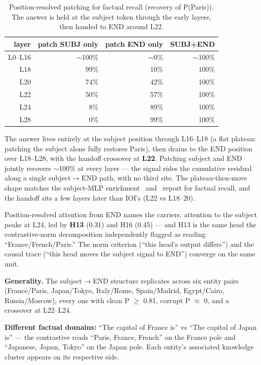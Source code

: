 \documentclass[11pt]{article}
\begin{document}
\begin{table}[htbp]
\centering
\small
\begin{tabular}{rrrr}
\toprule
layer & patch SUBJ only & patch END only & SUBJ+END \\
\midrule
L0--L16 & $\sim$100\% & $\sim$0\% & $\sim$100\% \\
L18 & 99\% & 10\% & 100\% \\
L20 & 74\% & 42\% & 100\% \\
L22 & 50\% & 57\% & 100\% \\
L24 & 8\% & 89\% & 100\% \\
L28 & 0\% & 99\% & 100\% \\
\bottomrule
\end{tabular}
\caption{Position-resolved patching for factual recall (recovery of P(Paris)). The answer is held at the subject token through the early layers, then handed to END around L22.}
\label{tab:fact-path}
\end{table}

The answer lives entirely at the subject position through L16--L18 (a flat
plateau: patching the subject alone fully restores Paris), then drains to the
END position over L18--L28, with the handoff crossover at \textbf{L22}. Patching
subject and END jointly recovers $\sim$100\% at every layer --- the signal rides the
cumulative residual along a single subject$\rightarrow$END path, with no third site. The
plateau-then-move shape matches the subject-MLP enrichment~\citet{meng2022}
and~\citet{geva2023} report for factual recall, and the handoff sits a few
layers later than IOI's (L22 vs L18--20).

Position-resolved attention from END names the carriers: attention to the
subject peaks at L24, led by \textbf{H13} (0.31) and H16 (0.45) --- and H13 is the same
head the contrastive-norm decomposition independently flagged as reading
``France/French/Paris.'' The norm criterion (``this head's output differs'') and the
causal trace (``this head moves the subject signal to END'') converge on the same
unit.

\textbf{Generality.} The subject$\rightarrow$END structure replicates across six entity pairs
(France/Paris, Japan/Tokyo, Italy/Rome, Spain/Madrid, Egypt/Cairo,
Russia/Moscow), every one with clean P $\ge$ 0.81, corrupt P $\approx$ 0, and a crossover at
L22--L24.

\textbf{Different factual domains:} ``The capital of France is'' vs ``The capital of
Japan is'' --- the contrastive reads ``Paris, France, French'' on the France pole
and ``Japanese, Japan, Tokyo'' on the Japan pole. Each entity's associated
knowledge cluster appears on its respective side.
\end{document}

